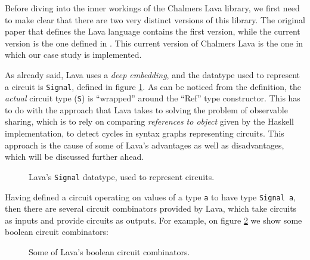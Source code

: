 \documentclass[a4paper]{article}
\begin{document}
            Before diving into the inner workings of the Chalmers Lava library, we first need to
            make clear that there are two very distinct versions of this library. The original paper
            that defines the Lava language\cite{lava1998} contains the first version, while the
            current version is the one defined in \cite{observable-sharing-1999}. This current
            version of Chalmers Lava is the one in which our case study is implemented.

            As already said, Lava uses a \emph{deep embedding}, and the datatype used to represent a
            circuit is \texttt{Signal}, defined in figure \ref{fig:lava-signal}. As can be noticed
            from the definition, the \emph{actual} circuit type (\texttt{S}) is ``wrapped'' around
            the ``Ref'' type constructor. This has to do with the approach that Lava takes to
            solving the problem of observable sharing, which is to rely on comparing
            \emph{references to object} given by the Haskell implementation, to detect cycles in
            syntax graphs representing circuits. This approach is the cause of some of Lava's
            advantages as well as disadvantages, which will be discussed further ahead.

            \begin{figure}[h]
                \begin{center}
                    
                \end{center}
                \caption{Lava's \texttt{Signal} datatype, used to represent circuits.
                    \label{fig:lava-signal}}
            \end{figure}

            Having defined a circuit operating on values of a type \texttt{a} to have type
            \texttt{Signal a}, then there are several circuit combinators provided by Lava, which
            take circuits as inputs and provide circuits as outputs. For example, on figure
            \ref{fig:lava-boolean-combinators} we show some boolean circuit combinators:

            \begin{figure}[h]
                \begin{center}
                    
                \end{center}
                \caption{Some of Lava's boolean circuit combinators.
                    \label{fig:lava-boolean-combinators}}
            \end{figure}
\end{document}
